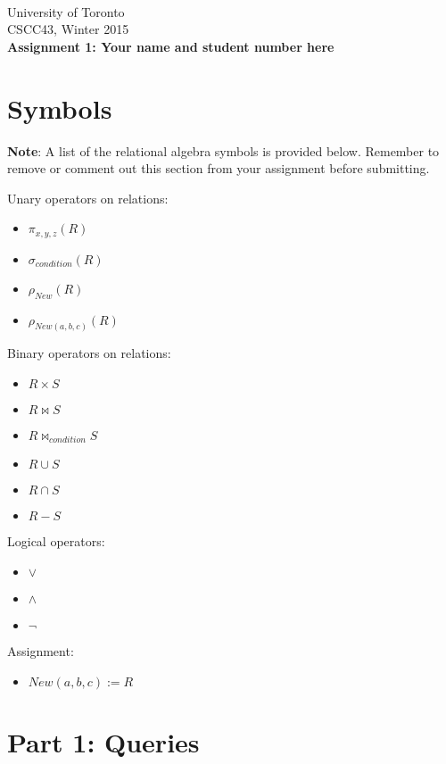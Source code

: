 \documentclass{article}
\begin{document}
~~~\vspace{-2.0cm}

\noindent
University of Toronto\\
{\sc CSCC}43, Winter 2015\\[10pt]
{\LARGE\bf Assignment 1: Your name and student number here}

\section*{Symbols}
\noindent\textbf{Note}: A list of the relational algebra symbols is provided below. Remember to remove or comment out this section from your assignment before submitting.

\noindent
Unary operators on relations:
\begin{itemize}
\item $\pi_{x, y, z} (R)$
\item $\sigma_{condition} (R) $
\item $\rho_{New} (R) $
\item $\rho_{New(a, b, c)} (R) $
\end{itemize}
Binary operators on relations:
\begin{itemize}
\item $R \times S$
\item $R \bowtie S$
\item $R \bowtie_{condition} S$
\item $R \cup S$
\item $R \cap S$
\item $R - S$
\end{itemize}
Logical operators:
\begin{itemize}
\item $\vee$
\item $\wedge$
\item $\neg$
\end{itemize}
Assignment:
\begin{itemize}
\item $New(a, b, c) := R$
\end{itemize}


\newpage
\section*{Part 1: Queries}
\end{document}
